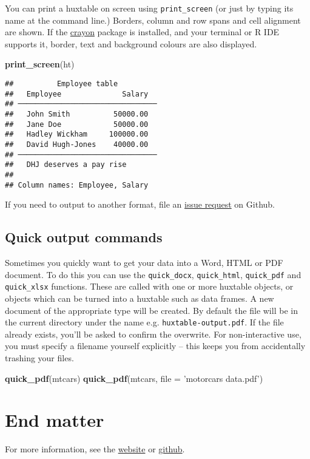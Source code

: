 \documentclass[]{article}
\newenvironment{Shaded}{\begin{snugshade}}{\end{snugshade}}
\newcommand{\DataTypeTok}[1]{\textcolor[rgb]{0.13,0.29,0.53}{#1}}
\newcommand{\KeywordTok}[1]{\textcolor[rgb]{0.13,0.29,0.53}{\textbf{#1}}}
\newcommand{\NormalTok}[1]{#1}
\newcommand{\StringTok}[1]{\textcolor[rgb]{0.31,0.60,0.02}{#1}}
\begin{document}
You can print a huxtable on screen using \texttt{print\_screen} (or just
by typing its name at the command line.) Borders, column and row spans
and cell alignment are shown. If the
\href{https://cran.r-project.org/package=crayon}{crayon} package is
installed, and your terminal or R IDE supports it, border, text and
background colours are also displayed.

\begin{Shaded}
\begin{Highlighting}[]
\KeywordTok{print_screen}\NormalTok{(ht)}
\end{Highlighting}
\end{Shaded}

\begin{verbatim}
##          Employee table         
##   Employee              Salary  
## ────────────────────────────────
##   John Smith          50000.00  
##   Jane Doe            50000.00  
##   Hadley Wickham     100000.00  
##   David Hugh-Jones    40000.00  
## ────────────────────────────────
##   DHJ deserves a pay rise       
## 
## Column names: Employee, Salary
\end{verbatim}

\FloatBarrier

If you need to output to another format, file an
\href{https://github.com/hughjonesd/huxtable}{issue request} on Github.

\hypertarget{quick-output-commands}{%
\subsection{Quick output commands}\label{quick-output-commands}}

Sometimes you quickly want to get your data into a Word, HTML or PDF
document. To do this you can use the \texttt{quick\_docx},
\texttt{quick\_html}, \texttt{quick\_pdf} and \texttt{quick\_xlsx}
functions. These are called with one or more huxtable objects, or
objects which can be turned into a huxtable such as data frames. A new
document of the appropriate type will be created. By default the file
will be in the current directory under the name e.g.
\texttt{huxtable-output.pdf}. If the file already exists, you'll be
asked to confirm the overwrite. For non-interactive use, you must
specify a filename yourself explicitly -- this keeps you from
accidentally trashing your files.

\begin{Shaded}
\begin{Highlighting}[]
\KeywordTok{quick_pdf}\NormalTok{(mtcars) }
\KeywordTok{quick_pdf}\NormalTok{(mtcars, }\DataTypeTok{file =} \StringTok{'motorcars data.pdf'}\NormalTok{)}
\end{Highlighting}
\end{Shaded}

\FloatBarrier

\hypertarget{end-matter}{%
\section{End matter}\label{end-matter}}

For more information, see the
\href{https://hughjonesd.github.io/huxtable}{website} or
\href{https://github.com/hughjonesd/huxtable}{github}.
\end{document}
